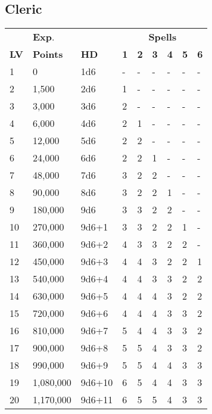 \documentclass[a4paper,twoside,openany,10pt]{book}
\begin{document}
\begin{multicols}{2}

\subsection{Cleric}\label{cleric}

\begin{tabular*}{0.93\linewidth}{@{\extracolsep{\fill}}lllllllll}

	& \textbf{Exp}. & & \multicolumn{6}{c}{\textbf{Spells}} \\
	\textbf{LV} & \textbf{Points} & \textbf{HD} & \textbf{1} & \textbf{2} & \textbf{3} & \textbf{4} & \textbf{5} & \textbf{6} \\\toprule
	1 & 0 & 1d6 & - & - & - & - & - & - \\\hline
	2 & 1,500 & 2d6 & 1 & - & - & - & - & - \\\hline
	3 & 3,000 & 3d6 & 2 & - & - & - & - & - \\\hline
	4 & 6,000 & 4d6 & 2 & 1 & - & - & - & - \\\hline
	5 & 12,000 & 5d6 & 2 & 2 & - & - & - & - \\\hline
	6 & 24,000 & 6d6 & 2 & 2 & 1 & - & - & - \\\hline
	7 & 48,000 & 7d6 & 3 & 2 & 2 & - & - & - \\\hline
	8 & 90,000 & 8d6 & 3 & 2 & 2 & 1 & - & - \\\hline
	9 & 180,000 & 9d6 & 3 & 3 & 2 & 2 & - & - \\\hline
	10 & 270,000 & 9d6+1 & 3 & 3 & 2 & 2 & 1 & - \\\hline
	11 & 360,000 & 9d6+2 & 4 & 3 & 3 & 2 & 2 & - \\\hline
	12 & 450,000 & 9d6+3 & 4 & 4 & 3 & 2 & 2 & 1 \\\hline
	13 & 540,000 & 9d6+4 & 4 & 4 & 3 & 3 & 2 & 2 \\\hline
	14 & 630,000 & 9d6+5 & 4 & 4 & 4 & 3 & 2 & 2 \\\hline
	15 & 720,000 & 9d6+6 & 4 & 4 & 4 & 3 & 3 & 2 \\\hline
	16 & 810,000 & 9d6+7 & 5 & 4 & 4 & 3 & 3 & 2 \\\hline
	17 & 900,000 & 9d6+8 & 5 & 5 & 4 & 3 & 3 & 2 \\\hline
	18 & 990,000 & 9d6+9 & 5 & 5 & 4 & 4 & 3 & 3 \\\hline
	19 & 1,080,000 & 9d6+10 & 6 & 5 & 4 & 4 & 3 & 3 \\\hline
	20 & 1,170,000 & 9d6+11 & 6 & 5 & 5 & 4 & 3 & 3 \\\bottomrule
\end{tabular*}\medskip



\end{multicols}
\end{document}
